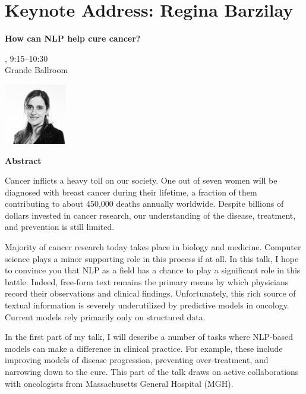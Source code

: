 \section{Keynote Address: Regina Barzilay}

\begin{center}
\begin{Large}
{\bfseries\Large How can NLP help cure cancer?}\vspace{1em}\par
\end{Large}

\daydateyear, 9:15--10:30 \vspace{1em}\\
Grande Ballroom \\
\vspace{1em}\par
\includegraphics[height=100px]{content/day1/regina-hs-bw.jpg}
\end{center}

\noindent
{\bfseries Abstract} 

Cancer inflicts a heavy toll on our society. One out of seven women will 
be diagnosed with breast cancer during their lifetime, a fraction of them 
contributing to about 450,000 deaths annually worldwide. Despite billions 
of dollars invested in cancer research, our understanding of the disease, 
treatment, and prevention is still limited.

Majority of cancer research today takes place in biology and medicine. 
Computer science plays a minor supporting role in this process if at all. 
In this talk, I hope to convince you that NLP as a field has a chance to 
play a significant role in this battle. Indeed, free-form text remains the 
primary means by which physicians record their observations and clinical 
findings. Unfortunately, this rich source of textual information is 
severely underutilized by predictive models in oncology. Current models 
rely primarily only on structured data.

In the first part of my talk, I will describe a number of tasks where 
NLP-based models can make a difference in clinical practice. For example, 
these include improving models of disease progression, preventing 
over-treatment, and narrowing down to the cure. This part of the talk 
draws on active collaborations with oncologists from Massachusetts General 
Hospital (MGH).

